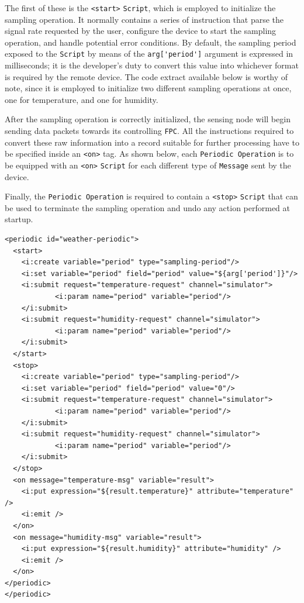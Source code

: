 The first of these is the \lstinline!<start>! \texttt{Script}, which is
employed to initialize the sampling operation. It normally contains a series of
instruction that parse the signal rate requested by the user, configure the
device to start the sampling operation, and handle potential error conditions.
By default, the sampling period exposed to the \texttt{Script} by means of the
\lstinline!arg['period']! argument is expressed in milliseconds; it is the
developer's duty to convert this value into whichever format is required by the
remote device. The code extract available below is worthy of note, since it is
employed to initialize two different sampling operations at once, one for
temperature, and one for humidity.

After the sampling operation is correctly initialized, the sensing node will
begin sending data packets towards its controlling \texttt{FPC}. All the
instructions required to convert these raw information into a record suitable
for further processing have to be specified inside an \lstinline!<on>! tag. As
shown below, each \texttt{Periodic Operation} is to be equipped with an
\lstinline!<on>! \texttt{Script} for each different type of \texttt{Message}
sent by the device.

Finally, the \texttt{Periodic Operation} is required to contain a
\lstinline!<stop>! \texttt{Script} that can be used to terminate the sampling
operation and undo any action performed at startup.

\lstset{language=XML}
\begin{lstlisting}
<periodic id="weather-periodic">
  <start>
    <i:create variable="period" type="sampling-period"/>
    <i:set variable="period" field="period" value="${arg['period']}"/>
    <i:submit request="temperature-request" channel="simulator">
            <i:param name="period" variable="period"/>
    </i:submit>
    <i:submit request="humidity-request" channel="simulator">
            <i:param name="period" variable="period"/>
    </i:submit>
  </start>
  <stop>
    <i:create variable="period" type="sampling-period"/>
    <i:set variable="period" field="period" value="0"/>
    <i:submit request="temperature-request" channel="simulator">
            <i:param name="period" variable="period"/>
    </i:submit>
    <i:submit request="humidity-request" channel="simulator">
            <i:param name="period" variable="period"/>
    </i:submit>
  </stop>
  <on message="temperature-msg" variable="result">
    <i:put expression="${result.temperature}" attribute="temperature" />
    <i:emit />
  </on>
  <on message="humidity-msg" variable="result">
    <i:put expression="${result.humidity}" attribute="humidity" />
    <i:emit />
  </on>
</periodic>
</periodic>
\end{lstlisting}

